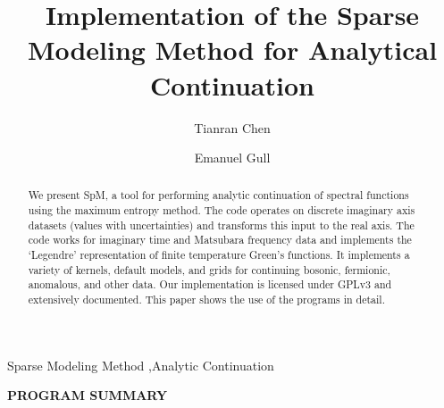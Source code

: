 \documentclass[final,5p,twocolumn,12pt]{elsarticle}
\begin{document}
\newcommand{\ME}{\begin{tt}Maxent\end{tt}}
\newcommand{\MEsp}{\begin{tt}Maxent\end{tt} }
\begin{frontmatter}

\title{Implementation of the Sparse Modeling Method for Analytical Continuation}


\author[a]{Tianran Chen}
\author[b]{Emanuel Gull}

\address[a]{Department of Physics, West Chester University, PA 19380, USA}
\address[b]{Department of Physics, University of Michigan, Ann Arbor, MI 48109, USA}

\begin{abstract}
We present SpM, a tool for performing analytic continuation of spectral functions using the maximum entropy method. The code operates on discrete imaginary axis datasets (values with uncertainties) and transforms this input to the real axis. The code works for imaginary time and Matsubara frequency data and implements the `Legendre' representation of finite temperature Green's functions. It implements a variety of kernels, default models, and grids for continuing bosonic, fermionic, anomalous, and other data. Our implementation is licensed under GPLv3 and extensively documented. This paper shows the use of the programs in detail.
\end{abstract}

\begin{keyword}
Sparse Modeling Method \sep Analytic Continuation
\end{keyword}

\end{frontmatter}



{\bf PROGRAM SUMMARY}
\end{document}

